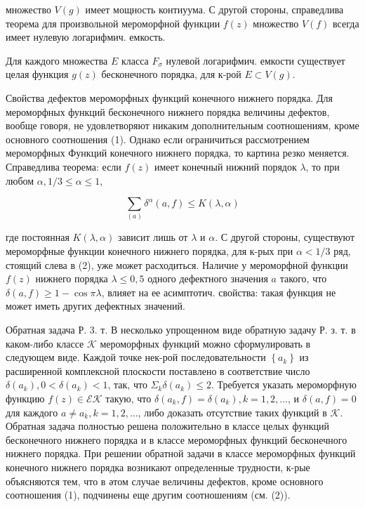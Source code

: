 \documentclass[10pt]{article}
\begin{document}
множество $V(g)$ имеет мощность контиуума. С другой стороны, справедлива теорема для произвольной мероморфной функции $f(z)$ множество $V(f)$ всегда имеет нулевую логарифмич. емкость.



Для каждого множества $E$ класса $F_{\sigma}$ нулевой логарифмич. емкости существует целая функция $g(z)$ бесконечного порядка, для к-рой $E \subset V(g)$.



Свойства дефектов мероморфных функций конечного нижнего порядка. Для мероморфных функций бесконечного нижнего порядка величины дефектов, вообще говоря, не удовлетворяют никаким дополнительным соотношениям, кроме основного соотношения (1). Однако если ограничиться рассмотрением мероморфных Функций конечного нижнего порядка, то картина резко меняется. Справедлива теорема: если $f(z)$ имеет конечный нижний порядок $\lambda$, то при любом $\alpha, 1 / 3 \leqslant \alpha \leqslant 1$,



\[

\sum_{(a)} \delta^{\alpha}(a, f) \leqslant K(\lambda, \alpha)

\]



где постоянная $K(\lambda, \alpha)$ зависит лишь от $\lambda$ и $\alpha$. С другой стороны, существуют мероморфные функции конечного нижнего порядка, для к-рых при $\alpha<1 / 3$ ряд, стоящий слева в (2), уже может расходиться. Наличие у мероморфной функции $f(z)$ нижнего порядка $\lambda \leqslant 0,5$ одного дефектного значения $a$ такого, что $\delta(a, f) \geqslant 1-\cos \pi \lambda$, влияет на ее асимптотич. свойства: такая функция не может иметь других дефектных значений.



Обратная задача Р. 3. т. В несколько упрощенном виде обратную задачу Р. з. т. в каком-либо классе $\mathscr{K}$ мероморфных функций можно сформулировать в следующем виде. Каждой точке нек-рой последовательности $\left\{a_{k}\right\}$ из расширенной комплексной плоскости поставлено в соответствие число $\delta\left(a_{k}\right), 0<\delta\left(a_{k}\right)<1$, так, что $\Sigma_{k} \delta\left(a_{k}\right) \leqslant 2$. Требуется указать мероморфную функцию $f(z) \in \mathcal{E} \mathcal{K}$ такую, что $\delta\left(a_{k}, f\right)=\delta\left(a_{k}\right), k=1,2, \ldots$, и $\delta(a, f)=0$ для каждого $a \neq a_{k}, k=1,2, \ldots$, либо доказать отсутствие таких функций в $\mathscr{K}$. Обратная задача полностью решена положительно в классе целых функций бесконечного нижнего порядка и в классе мероморфных функций бесконечного нижнего порядка. При решении обратной задачи в классе мероморфных функций конечного нижнего порядка возникают определенные трудности, к-рые объясняются тем, что в әтом случае величины дефектов, кроме основного соотношения (1), подчинены еще другим соотношениям (см. (2)).
\end{document}
